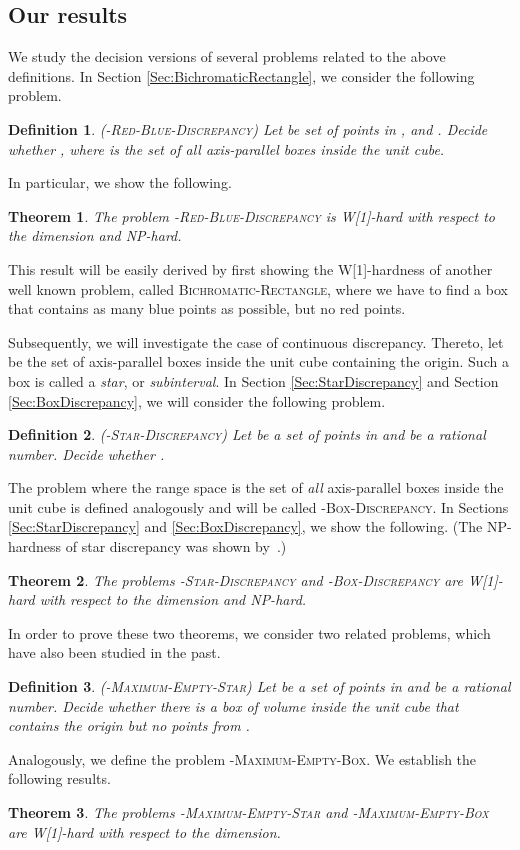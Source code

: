 \documentclass[12pt]{article}
\newtheorem{theorem}{Theorem}
\newtheorem{definition}{Definition}
\begin{document}
\subsection{Our results}
We study the decision versions of several problems related to the above definitions.
In Section \ref{Sec:BichromaticRectangle}, we consider the following problem.
\begin{definition} (-\textsc{Red-Blue-Discrepancy}) Let  be set of points in , and . Decide whether , where  is the set of all axis-parallel boxes inside the unit cube.
\end{definition}

In particular, we show the following.
\begin{theorem}\label{Thm:RedBlueMain} The problem -\textsc{Red-Blue-Discrepancy} is W[1]-hard with respect to the dimension and NP-hard.
\end{theorem}
This result will be easily derived by first showing the W[1]-hardness of another well known problem, called \textsc{Bichromatic-Rectangle}, where we have to find a box that contains as many blue points as possible, but no red points.

Subsequently, we will investigate the case of continuous discrepancy. Thereto, let  be the set of axis-parallel boxes inside the unit cube containing the origin. Such a box is called a \emph{star}, or \emph{subinterval}. In Section \ref{Sec:StarDiscrepancy} and Section \ref{Sec:BoxDiscrepancy}, we will consider the following problem.
\begin{definition} (-\textsc{Star-Discrepancy}) Let  be a set of points in  and  be a rational number. Decide whether .
\end{definition}
The problem where the range space is the set of \emph{all} axis-parallel boxes inside the unit cube  is defined analogously and will be called -\textsc{Box-Discrepancy}. In Sections \ref{Sec:StarDiscrepancy} and \ref{Sec:BoxDiscrepancy}, we show the following. (The NP-hardness of star discrepancy was shown by~\cite{GSW09}.)
\begin{theorem}\label{Thm:ContinuousDiscrepancyMain} The problems -\textsc{Star-Discrepancy} and -\textsc{Box-Discrepancy} are W[1]-hard with respect to the dimension and NP-hard. 
\end{theorem}

In order to prove these two theorems, we consider two related problems, which have also been studied in the past.
\begin{definition} (-\textsc{Maximum-Empty-Star}) Let  be a set of points in  and  be a rational number. Decide whether there is a box of volume  inside the unit cube that contains the origin but no points from .
\end{definition}
Analogously, we define the problem -\textsc{Maximum-Empty-Box}. We establish the following results.
\begin{theorem}\label{Thm:EmptyBoxMain} The problems -\textsc{Maximum-Empty-Star} and -\textsc{Maximum-Empty-Box} are W[1]-hard with respect to the dimension. 
\end{theorem}
\end{document}
